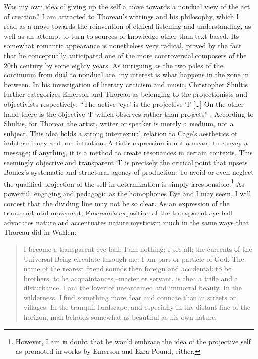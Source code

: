 \documentclass[a4paper]{article}
\begin{document}
Was my own idea of giving up the self a move towards a nondual view of the act of creation? I am attracted to Thoreau's writings and his philosophy, which I read as a move towards the reinvention of ethical listening and understanding, as well as an attempt to turn to sources of knowledge other than text based. Its somewhat romantic appearance is nonetheless very radical, proved by the fact that he conceptually anticipated one of the more controversial composers of the 20th century by some eighty years. As intriguing as the two poles of the continuum from dual to nondual are, my interest is what happens in the zone in between. In his investigation of literary criticism and music, Christopher Shultis further categorizes Emerson and Thoreau as belonging to the projectionists and objectivists respectively: ``The active `eye' is the projective `I' [\ldots] On the other hand there is the objective `I' which observes rather than projects'' \citep[][p. 61-2]{shultis98}. According to Shultis, for Thoreau the artist, writer or speaker is merely a medium, not a subject. This idea holds a strong intertextual relation to Cage's aesthetics of indeterminacy and non-intention. Artistic expression is not a means to convey a message; if anything, it is a method to create resonances in certain contexts. This seemingly objective and transparent `I' is precisely the critical point that upsets Boulez's systematic and structural agency of production: To avoid or even neglect the qualified projection of the self in determination is simply irresponsible.\footnote{However, I am in doubt that he would embrace the idea of the projective self as promoted in works by Emerson and Ezra Pound, either.} As powerful, engaging and pedagogic as the homophones Eye and I may seem, I will contest that the dividing line may not be so clear. As an expression of the transcendental movement, Emerson's exposition of the transparent eye-ball advocates nature and accentuates nature mysticism much in the same ways that Thoreau did in Walden:

\begin{quote}
I become a transparent eye-ball; I am nothing; I see all; the currents of the Universal   Being circulate through me; I am part or particle of God. The name of the nearest friend   sounds then foreign and accidental: to be brothers, to be acquaintances,--master or   servant, is then a trifle and a disturbance. I am the lover of uncontained and immortal   beauty. In the wilderness, I find something more dear and connate than in streets or   villages. In the tranquil landscape, and especially in the distant line of the horizon,   man beholds somewhat as beautiful as his own nature. \citep[p. 8] {emerson2001}
\end{quote}
\end{document}
